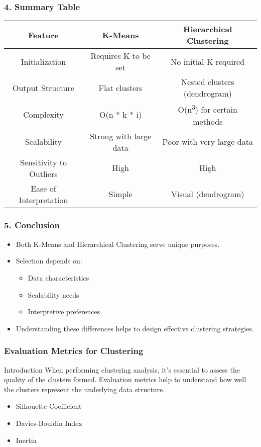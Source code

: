 \documentclass[aspectratio=169]{beamer}
\begin{document}
\begin{frame}[fragile]
    \frametitle{4. Summary Table}
    \begin{table}[h]
        \centering
        \begin{tabular}{|c|c|c|}
            \hline
            \textbf{Feature} & \textbf{K-Means} & \textbf{Hierarchical Clustering} \\
            \hline
            Initialization & Requires K to be set & No initial K required \\
            \hline
            Output Structure & Flat clusters & Nested clusters (dendrogram) \\
            \hline
            Complexity & O(n * k * i) & O(n\textsuperscript{3}) for certain methods \\
            \hline
            Scalability & Strong with large data & Poor with very large data \\
            \hline
            Sensitivity to Outliers & High & High \\
            \hline
            Ease of Interpretation & Simple & Visual (dendrogram) \\
            \hline
        \end{tabular}
    \end{table}
\end{frame}

\begin{frame}[fragile]
    \frametitle{5. Conclusion}
    \begin{itemize}
        \item Both K-Means and Hierarchical Clustering serve unique purposes.
        \item Selection depends on:
        \begin{itemize}
            \item Data characteristics
            \item Scalability needs
            \item Interpretive preferences
        \end{itemize}
        \item Understanding these differences helps to design effective clustering strategies.
    \end{itemize}
\end{frame}

\begin{frame}[fragile]
    \frametitle{Evaluation Metrics for Clustering}
    \begin{block}{Introduction}
        When performing clustering analysis, it's essential to assess the quality of the clusters formed. Evaluation metrics help to understand how well the clusters represent the underlying data structure.
    \end{block}
    \begin{itemize}
        \item Silhouette Coefficient
        \item Davies-Bouldin Index
        \item Inertia
    \end{itemize}
\end{frame}
\end{document}
